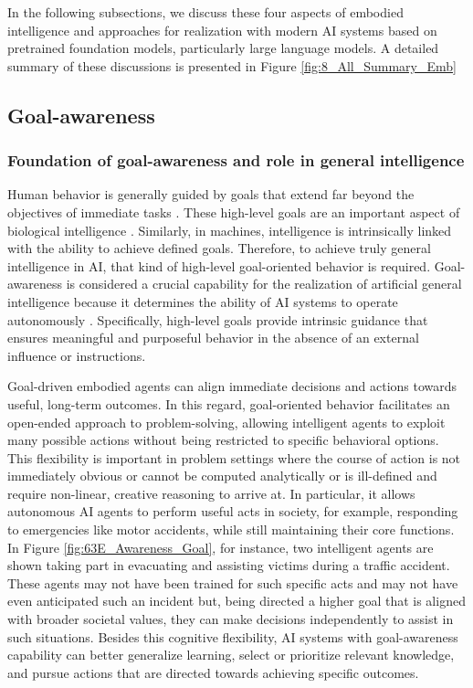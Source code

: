 \documentclass[10pt,journal,compsoc]{IEEEtran}
\begin{document}
	
	In the following subsections, we discuss these four aspects of embodied intelligence and approaches for realization with modern AI systems based on pretrained foundation models, particularly large language models. A detailed summary of these discussions is presented in Figure \ref{fig:8_All_Summary_Emb} 
	
	
	\subsection{Goal-awareness}
	
	\subsubsection{Foundation of goal-awareness and role in general intelligence}
	Human behavior is generally guided by goals that extend far beyond the objectives of immediate tasks \cite{ajzen1986prediction,frese2021goal,aarts2000habits}. These high-level goals are an important aspect of biological intelligence \cite{duncan1996intelligence}. Similarly, in machines, intelligence is intrinsically linked with the ability to achieve defined goals. Therefore, to achieve truly general intelligence in AI, that kind of high-level goal-oriented behavior is required. Goal-awareness is considered a crucial capability for the realization of artificial general intelligence because it determines the ability of AI systems to operate autonomously \cite{morrisposition,hansmeier2023xcs,goertzel2014golem}. Specifically, high-level goals provide intrinsic guidance that ensures meaningful and purposeful behavior in the absence of an external influence or instructions. 
	
	Goal-driven embodied agents can align immediate decisions and actions towards useful, long-term outcomes. In this regard, goal-oriented behavior facilitates an open-ended approach to problem-solving, allowing intelligent agents to exploit many possible actions without being restricted to specific behavioral options. This flexibility is important in problem settings where the course of action is not immediately obvious or cannot be computed analytically or is ill-defined and require non-linear, creative reasoning to arrive at. In particular, it allows autonomous AI agents to perform useful acts in society, for example, responding to emergencies like motor accidents, while still maintaining their core functions. In Figure \ref{fig:63E_Awareness_Goal}, for instance, two intelligent agents are shown taking part in evacuating and assisting victims during a traffic accident. These agents may not have been trained for such specific acts and may not have even anticipated such an incident but, being directed a higher goal that is aligned with broader societal values, they can make decisions independently to assist in such situations. Besides this cognitive flexibility, AI systems with goal-awareness capability can better generalize learning, select or prioritize relevant knowledge, and pursue actions that are directed towards achieving specific outcomes.  
	
\end{document}
